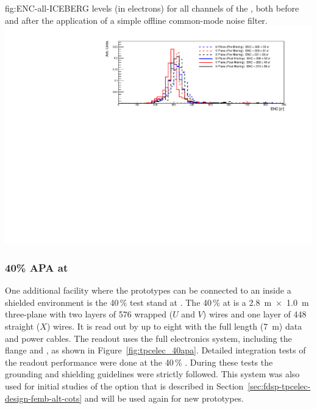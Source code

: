 \begin{dunefigure}
{fig:ENC-all-ICEBERG}
{ levels (in electrons) for all channels of the  ,
both before and after the application of a simple offline common-mode noise filter.}
\includegraphics[width=0.99\linewidth]{graphics/sp-tpcelec-ENC-Combined-ICEBERG.pdf}
\end{dunefigure}


\subsubsection{40\% APA at }
\label{sec:fdsp-tpcelec-qa-facilities-fortypercent}

One additional facility where the  prototypes can be connected to
an  inside a shielded environment is the \num{40}\,\%  
test stand at . The \num{40}\,\%  at  is a \SI{2.8}{m}~$\times$~\SI{1.0}{m} 
three-plane  with two layers of \num{576} wrapped ($U$ and $V$) wires 
and one layer of \num{448} straight ($X$) wires. It is read out by up to eight 
 with the full length (\SI{7}{m})  data and  power 
cables. The readout uses the full  electronics 
system, including the  flange and , as shown in Figure~\ref{fig:tpcelec_40apa}. 
Detailed integration tests of the   readout performance were done 
at the \num{40}\,\% . During these tests the  grounding and shielding guidelines
were strictly followed.  This system was also used for initial studies of the  
option that is described in Section~\ref{sec:fdsp-tpcelec-design-femb-alt-cots} and will
be used again for new  prototypes.

